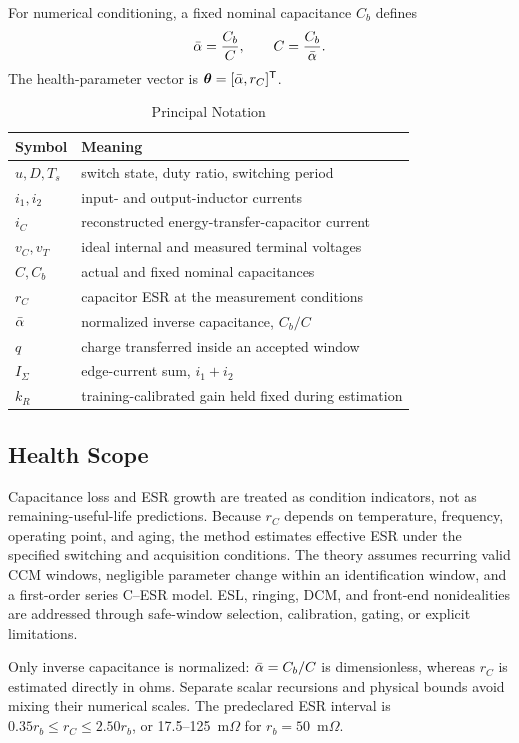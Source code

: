 For numerical conditioning, a fixed nominal capacitance $C_b$ defines
\begin{equation}
\bar{\alpha}=\frac{C_b}{C}, \qquad C=\frac{C_b}{\bar{\alpha}}.
\label{eq:alpha_definition}
\end{equation}
The health-parameter vector is $\bm{\theta}=[\bar{\alpha},r_C]^{\mathsf T}$.

\begin{table}[t]
\caption{Principal Notation}
\label{tab:notation}
\centering
\footnotesize
\begin{tabular}{ll}
\toprule
Symbol & Meaning \\
\midrule
$u,D,T_s$ & switch state, duty ratio, switching period \\
$i_1,i_2$ & input- and output-inductor currents \\
$i_C$ & reconstructed energy-transfer-capacitor current \\
$v_C,v_T$ & ideal internal and measured terminal voltages \\
$C,C_b$ & actual and fixed nominal capacitances \\
$r_C$ & capacitor ESR at the measurement conditions \\
$\bar{\alpha}$ & normalized inverse capacitance, $C_b/C$ \\
$q$ & charge transferred inside an accepted window \\
$I_\Sigma$ & edge-current sum, $i_1+i_2$ \\
$k_R$ & training-calibrated gain held fixed during estimation \\
\bottomrule
\end{tabular}
\end{table}

\subsection{Health Scope}

Capacitance loss and ESR growth are treated as condition indicators, not as remaining-useful-life predictions. Because $r_C$ depends on temperature, frequency, operating point, and aging, the method estimates effective ESR under the specified switching and acquisition conditions. The theory assumes recurring valid CCM windows, negligible parameter change within an identification window, and a first-order series C--ESR model. ESL, ringing, DCM, and front-end nonidealities are addressed through safe-window selection, calibration, gating, or explicit limitations.

Only inverse capacitance is normalized: $\bar{\alpha}=C_b/C$ is dimensionless, whereas $r_C$ is estimated directly in ohms. Separate scalar recursions and physical bounds avoid mixing their numerical scales. The predeclared ESR interval is $0.35r_b\le r_C\le2.50r_b$, or 17.5--125~m$\Omega$ for $r_b=50$~m$\Omega$.

